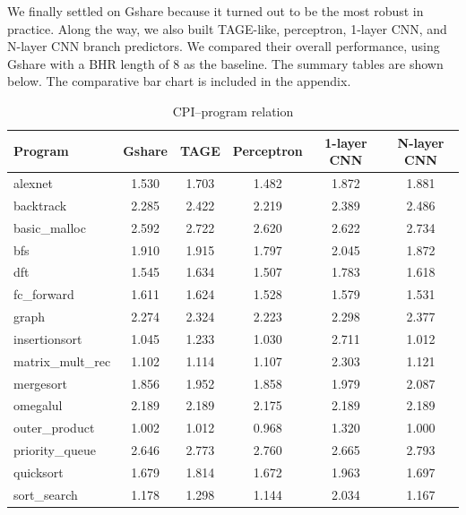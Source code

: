 We finally settled on Gshare because it turned out to be the most robust in practice. Along the way, we also built TAGE-like, perceptron, 1-layer CNN, and N-layer CNN branch predictors. We compared their overall performance, using Gshare with a BHR length of 8 as the baseline. The summary tables are shown below. The comparative bar chart is included in the appendix.
\begin{table}[ht]
  \scriptsize
  \setlength{\tabcolsep}{2pt}           
  \caption{CPI–program relation}
  \label{tab:branch-cpi}
  \begin{tabular*}{\columnwidth}{@{\extracolsep{\fill}}lccccc}
    \toprule
    Program & Gshare & TAGE & Perceptron & 1-layer CNN & N-layer CNN \\
    \midrule
    alexnet           & 1.530 & 1.703 & 1.482 & 1.872 & 1.881 \\
    backtrack         & 2.285 & 2.422 & 2.219 & 2.389 & 2.486 \\
    basic\_malloc     & 2.592 & 2.722 & 2.620 & 2.622 & 2.734 \\
    bfs               & 1.910 & 1.915 & 1.797 & 2.045 & 1.872 \\
    dft               & 1.545 & 1.634 & 1.507 & 1.783 & 1.618 \\
    fc\_forward       & 1.611 & 1.624 & 1.528 & 1.579 & 1.531 \\
    graph             & 2.274 & 2.324 & 2.223 & 2.298 & 2.377 \\
    insertionsort     & 1.045 & 1.233 & 1.030 & 2.711 & 1.012 \\
    matrix\_mult\_rec & 1.102 & 1.114 & 1.107 & 2.303 & 1.121 \\
    mergesort         & 1.856 & 1.952 & 1.858 & 1.979 & 2.087 \\
    omegalul          & 2.189 & 2.189 & 2.175 & 2.189 & 2.189 \\
    outer\_product    & 1.002 & 1.012 & 0.968 & 1.320 & 1.000 \\
    priority\_queue   & 2.646 & 2.773 & 2.760 & 2.665 & 2.793 \\
    quicksort         & 1.679 & 1.814 & 1.672 & 1.963 & 1.697 \\
    sort\_search      & 1.178 & 1.298 & 1.144 & 2.034 & 1.167 \\
    \bottomrule
  \end{tabular*}
\end{table}

